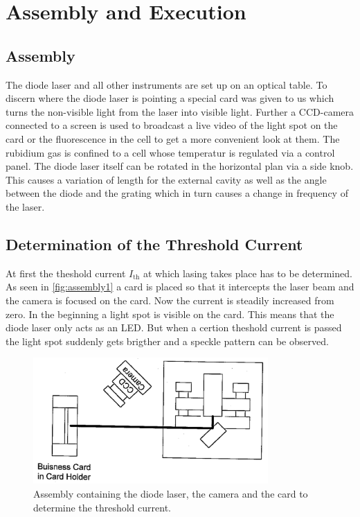 \section{Assembly and Execution}
\label{sec:Durchfuehrung}
\subsection{Assembly}
The diode laser and all other instruments are set up on an optical table. To discern where the diode laser is pointing a special card was given to us which turns the non-visible light from the laser into visible light.
Further a CCD-camera connected to a screen is used to broadcast a live video of the light spot on the card or the fluorescence in the cell to get a more convenient look at them.
The rubidium gas is confined to a cell whose temperatur is regulated via a control panel.
The diode laser itself can be rotated in the horizontal plan via a side knob.
This causes a variation of length for the external cavity as well as the angle between the diode and the grating which in turn causes a change in frequency of the laser.

\subsection{Determination of the Threshold Current}
\label{sec:threshold}
At first the theshold current $I_{\text{th}}$ at which lasing takes place has to be determined.
As seen in \autoref{fig:assembly1} a card is placed so that it intercepts the laser beam and the camera is focused on the card.
Now the current is steadily increased from zero.
In the beginning a light spot is visible on the card.
This means that the diode laser only acts as an LED.
But when a certion theshold current is passed the light spot suddenly gets brigther and a speckle pattern can be observed.
\begin{figure}
    \center
    \includegraphics[width=0.8\textwidth]{bilder/Assembly_1.png}
    \caption{Assembly containing the diode laser, the camera and the card to determine the threshold current. \cite{anleitung}}
    \label{fig:assembly1}
\end{figure}

